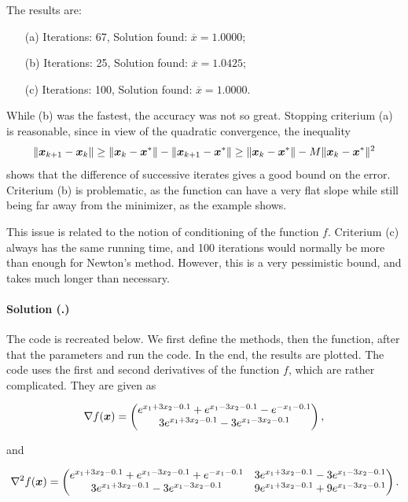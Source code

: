 \documentclass{article}
\newcounter{problemSheetNumber}
\newcounter{problems}
\renewcommand{\solution}[1]{\paragraph{Solution (\theproblemSheetNumber.\theproblems)}\addtocounter{problems}{1}\label{#1}}
\begin{document}
The results are:
\begin{itemize}
 \item[(a)] Iterations: 67, Solution found: $\overline{x}=1.0000$;
 \item[(b)] Iterations: 25, Solution found: $\overline{x}=1.0425$;
 \item[(c)] Iterations: 100, Solution found: $\overline{x}=1.0000$.
\end{itemize}
While (b) was the fastest, the accuracy was not so great. Stopping criterium (a) is reasonable, since in view of the quadratic convergence, the inequality
\begin{equation*}
 \Vert {\bm{x}_{k+1}-\bm{x}_k}\Vert\geq \Vert {\bm{x}_k-\bm{x}^*}\Vert-\Vert {\bm{x}_{k+1}-\bm{x}^*}\Vert \geq \Vert {\bm{x}_k-\bm{x}^*}\Vert-M\Vert {\bm{x}_{k}-\bm{x}^*}\Vert^2
\end{equation*}
shows that the difference of successive iterates gives a good bound on the error. Criterium (b) is problematic, as the function can have a very flat slope while still being far away from the minimizer, as the example shows.

This issue is related to the notion of conditioning of the function $f$. Criterium (c) always has the same running time, and 100 iterations would normally be more than enough for Newton's method. However, this is a very pessimistic bound, and takes much longer than necessary.

\solution{pr:2} The code is recreated below. We first define the methods, then the function, after that the parameters and run the code. In the end, the results are plotted. 
The code uses the first and second derivatives of the function $f$, which are rather complicated. They are given as

\begin{equation*}
\nabla f(\bm{x}) = \begin{pmatrix}
e^{x_1+3x_2-0.1} + e^{x_1-3x_2-0.1} - e^{-x_1-0.1}\\
3e^{x_1+3x_2-0.1} - 3e^{x_1-3x_2-0.1}
\end{pmatrix},
\end{equation*}

and

\begin{equation*}
 \nabla^2 f(\bm{x}) = \begin{pmatrix}
 e^{x_1+3x_2-0.1} + e^{x_1-3x_2-0.1} + e^{-x_1-0.1} & 3e^{x_1+3x_2-0.1} - 3e^{x_1-3x_2-0.1}\\
 3e^{x_1+3x_2-0.1} - 3e^{x_1-3x_2-0.1} & 9e^{x_1+3x_2-0.1} + 9e^{x_1-3x_2-0.1}
 \end{pmatrix}.
\end{equation*}
\end{document}
